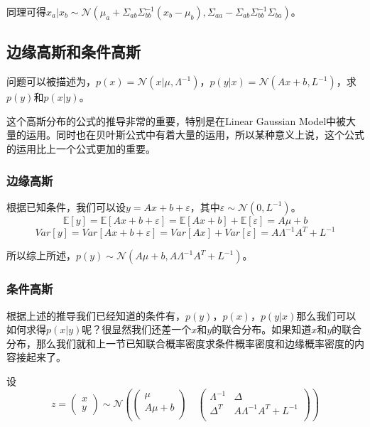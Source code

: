 \documentclass[a4paper]{article}
\numberwithin{equation}{section}
\begin{document}
同理可得$x_a|x_b\sim \mathcal{N}(\mu_a+\Sigma_{ab}\Sigma_{bb}^{-1}(x_b-\mu_b), \Sigma_{aa}-\Sigma_{ab}\Sigma_{bb}^{-1}\Sigma_{ba})$。

\subsection{边缘高斯和条件高斯}
问题可以被描述为，$p(x)=\mathcal{N}(x|\mu,\Lambda^{-1})$，$p(y|x)=\mathcal{N}(Ax+b,L^{-1})$，求$p(y)$和$p(x|y)$。

这个高斯分布的公式的推导非常的重要，特别是在Linear Gaussian Model中被大量的运用。同时也在贝叶斯公式中有着大量的运用，所以某种意义上说，这个公式的运用比上一个公式更加的重要。

\subsubsection{边缘高斯}

根据已知条件，我们可以设$y=Ax+b+\varepsilon$，其中$\varepsilon\sim\mathcal{N}(0,L^{-1})$。
\begin{equation}
    \mathbb{E}[y]=\mathbb{E}[Ax+b+\varepsilon] = \mathbb{E}[Ax+b]+ \mathbb{E}[\varepsilon] = A\mu +b
\end{equation}
\begin{equation}
    Var[y] = Var[Ax+b+\varepsilon] = Var[Ax]+Var[\varepsilon]=A\Lambda^{-1}A^T +L^{-1}
\end{equation}

所以综上所述，$p(y)\sim\mathcal{N}(A\mu +b, A\Lambda^{-1}A^T +L^{-1})$。

\subsubsection{条件高斯}
根据上述的推导我们已经知道的条件有，$p(y)$，$p(x)$，$p(y|x)$那么我们可以如何求得$p(x|y)$呢？很显然我们还差一个$x$和$y$的联合分布。如果知道$x$和$y$的联合分布，那么我们就和上一节已知联合概率密度求条件概率密度和边缘概率密度的内容接起来了。

设
\begin{equation}
    z=
    \begin{pmatrix}
        x \\ 
        y
    \end{pmatrix} \sim
    \mathcal{N}
    \left(
    \begin{pmatrix}
        \mu \\
        A\mu + b \\
    \end{pmatrix}
    \quad
    \begin{pmatrix}
        \Lambda^{-1} & \Delta \\
        \Delta^T   & A\Lambda^{-1}A^T +L^{-1} \\
    \end{pmatrix}
    \right)
\end{equation}
\end{document}
